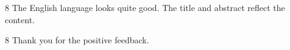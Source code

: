 \begin{reviewcomment}{8}
	The English language looks quite good. The title and abstract reflect the content.
\end{reviewcomment}

\begin{reviewresponse}{8}
	Thank you for the positive feedback.
\end{reviewresponse}
